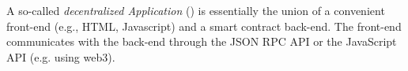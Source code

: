 \subsubsection{\dapp}
\label{sec:dapp}

A so-called \emph{decentralized Application} (\dapp) is essentially the union of
a convenient front-end (e.g., HTML, Javascript) and a smart contract back-end.
The front-end communicates with the back-end through the JSON RPC API or the
JavaScript API (e.g. using web3).


 
